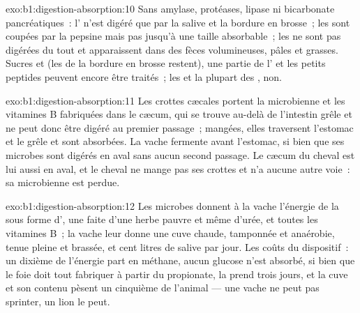 \begin{solution}{exo:b1:digestion-absorption:10}
Sans amylase, protéases, lipase ni bicarbonate pancréatiques~: l'
n'est digéré que par la salive et la bordure en brosse~; les 
sont coupées par la pepsine mais pas jusqu'à une taille absorbable~; les
 ne sont pas digérées du tout et apparaissent dans des fèces
volumineuses, pâles et grasses. Sucres et  (les  de
la bordure en brosse restent), une partie de l' et les petits
peptides peuvent encore être traités~; les  et la plupart des
, non.
\end{solution}

\begin{solution}{exo:b1:digestion-absorption:11}
Les crottes cæcales portent la  microbienne et les vitamines B
fabriquées dans le cæcum, qui se trouve au-delà de l'intestin grêle et
ne peut donc être digéré au premier passage~; mangées, elles traversent
l'estomac et le grêle et sont absorbées. La vache fermente avant
l'estomac, si bien que ses microbes sont digérés en aval sans aucun
second passage. Le cæcum du cheval est lui aussi en aval, et le cheval
ne mange pas ses crottes et n'a aucune autre voie~: sa 
microbienne est perdue.
\end{solution}

\begin{solution}{exo:b1:digestion-absorption:12}
Les microbes donnent à la vache l'énergie de la  sous forme
d', une  faite d'une herbe pauvre et même d'urée, et
toutes les vitamines B~; la vache leur donne une cuve chaude, tamponnée
et anaérobie, tenue pleine et brassée, et cent litres de salive par
jour. Les coûts du dispositif~: un dixième de l'énergie part en méthane,
aucun glucose n'est absorbé, si bien que le foie doit tout fabriquer à
partir du propionate, la  prend trois jours, et la cuve et son
contenu pèsent un cinquième de l'animal --- une vache ne peut pas
sprinter, un lion le peut.
\end{solution}

